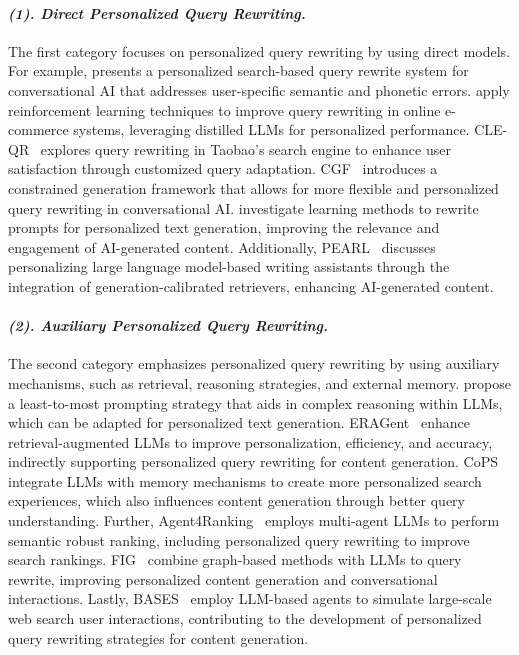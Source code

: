 \paragraph{\textbf{\textit{{(1). Direct Personalized Query Rewriting.}}}}

The first category focuses on personalized query rewriting by using direct models. 
For example, \citet{cho2021personalized} 
presents a personalized search-based query rewrite system for conversational AI that addresses user-specific semantic and phonetic errors. 
\citet{nguyen2025rl} apply reinforcement learning techniques to improve query rewriting in online e-commerce systems, leveraging distilled LLMs for personalized performance. 
CLE-QR~\cite{li2022query} explores query rewriting in Taobao's search engine to enhance user satisfaction through customized query adaptation. 
CGF~\cite{hao2022cgf} introduces a constrained generation framework that allows for more flexible and personalized query rewriting in conversational AI. 
\citet{li2024learning} investigate learning methods to rewrite prompts for personalized text generation, improving the relevance and engagement of AI-generated content. 
Additionally, PEARL~\cite{mysore2023pearl} discusses personalizing large language model-based writing assistants through the integration of generation-calibrated retrievers, enhancing AI-generated content.

\paragraph{\textbf{\textit{{(2). Auxiliary Personalized Query Rewriting.}}}} The second category emphasizes personalized query rewriting by using auxiliary mechanisms, such as retrieval, reasoning strategies, and external memory. 
\citet{zhou2022least} propose a least-to-most prompting strategy that aids in complex reasoning within LLMs, which can be adapted for personalized text generation.
ERAGent~\cite{shi2024eragent} enhance retrieval-augmented LLMs to improve personalization, efficiency, and accuracy, indirectly supporting personalized query rewriting for content generation. 
CoPS~\cite{zhou2024cognitive} integrate LLMs with memory mechanisms to create more personalized search experiences, which also influences content generation through better query understanding.
Further,  Agent4Ranking~\cite{li2023agent4ranking} employs multi-agent LLMs to perform semantic robust ranking, including personalized query rewriting to improve search rankings. 
FIG~\cite{chen2023graph} combine graph-based methods with LLMs to query rewrite, improving personalized content generation and conversational interactions. 
Lastly, BASES~\cite{ren2024bases} employ LLM-based agents to simulate large-scale web search user interactions, contributing to the development of personalized query rewriting strategies for content generation.


